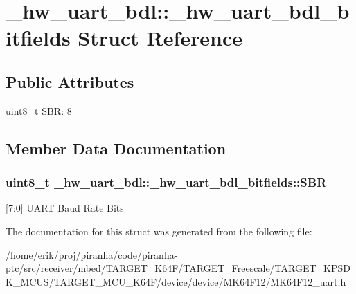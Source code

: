 \hypertarget{struct__hw__uart__bdl_1_1__hw__uart__bdl__bitfields}{}\section{\+\_\+hw\+\_\+uart\+\_\+bdl\+:\+:\+\_\+hw\+\_\+uart\+\_\+bdl\+\_\+bitfields Struct Reference}
\label{struct__hw__uart__bdl_1_1__hw__uart__bdl__bitfields}
\subsection*{Public Attributes}
\begin{DoxyCompactItemize}
\item 
uint8\+\_\+t \hyperlink{struct__hw__uart__bdl_1_1__hw__uart__bdl__bitfields_ac0812ffb17406e3d8e27983ab0dbfb9b}{S\+BR}\+: 8
\end{DoxyCompactItemize}


\subsection{Member Data Documentation}
\subsubsection[{\texorpdfstring{S\+BR}{SBR}}]{\setlength{\rightskip}{0pt plus 5cm}uint8\+\_\+t \+\_\+hw\+\_\+uart\+\_\+bdl\+::\+\_\+hw\+\_\+uart\+\_\+bdl\+\_\+bitfields\+::\+S\+BR}\hypertarget{struct__hw__uart__bdl_1_1__hw__uart__bdl__bitfields_ac0812ffb17406e3d8e27983ab0dbfb9b}{}\label{struct__hw__uart__bdl_1_1__hw__uart__bdl__bitfields_ac0812ffb17406e3d8e27983ab0dbfb9b}
\mbox{[}7\+:0\mbox{]} U\+A\+RT Baud Rate Bits 

The documentation for this struct was generated from the following file\+:\begin{DoxyCompactItemize}
\item 
/home/erik/proj/piranha/code/piranha-\/ptc/src/receiver/mbed/\+T\+A\+R\+G\+E\+T\+\_\+\+K64\+F/\+T\+A\+R\+G\+E\+T\+\_\+\+Freescale/\+T\+A\+R\+G\+E\+T\+\_\+\+K\+P\+S\+D\+K\+\_\+\+M\+C\+U\+S/\+T\+A\+R\+G\+E\+T\+\_\+\+M\+C\+U\+\_\+\+K64\+F/device/device/\+M\+K64\+F12/M\+K64\+F12\+\_\+uart.\+h\end{DoxyCompactItemize}
